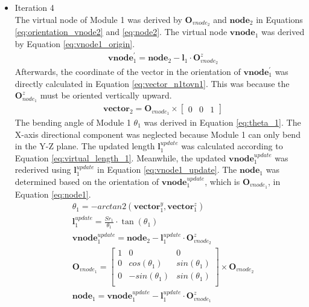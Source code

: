 \begin{itemize}
    \item Iteration 4 \\ %
    The virtual node of Module 1 was derived by $\textbf{O}_{vnode_2}$ and $\textbf{node}_{2}$ in Equations 
    \ref{eq:orientation_vnode2} and \ref{eq:node2}. The virtual node $\textbf{vnode}_{1}$ was derived by Equation 
    \ref{eq:vnode1_origin}.
    \begin{align}
        &\textbf{vnode}_{1}^{'} = \textbf{node}_{2} - \textbf{l}_{1} \cdot \textbf{O}_{vnode_2}^{z}
        \label{eq:vnode1_origin}
    \end{align}
    Afterwards, the coordinate of the vector in the orientation of $\textbf{vnode}_{1}^{'}$ was directly calculated 
    in Equation \ref{eq:vector_n1tovn1}. This was because the $\textbf{O}_{node_1}^{z}$ must be oriented vertically upward.
    \begin{align}
        &\textbf{vector}_{2} = \textbf{O}_{vnode_1} \times \begin{bmatrix} 0 & 0 & 1 \end{bmatrix} 
        \label{eq:vector_n1tovn1} 
    \end{align}
    The bending angle of Module 1 $\theta_1$ was derived in Equation \ref{eq:theta_1}. The X-axis directional 
    component was neglected because Module 1 can only bend in the Y-Z plane. The updated length $\textbf{l}_{1}^{update}$ 
    was calculated according to Equation \ref{eq:virtual_length_1}. Meanwhile, the updated 
    $\textbf{vnode}_{1}^{update}$ was rederived using $\textbf{l}_{1}^{update}$ in Equation \ref{eq:vnode1_update}. 
    The $\textbf{node}_1$ was determined based on the orientation of $\textbf{vnode}_{1}^{update}$, 
    which is $\textbf{O}_{vnode_1}$, in Equation \ref{eq:node1}.
    \begin{align}
        &\theta_1 = -arctan2(\textbf{vector}_{1}^{y},\textbf{vector}_{1}^{z})
        \label{eq:theta_1} \\
        &\textbf{l}_{1}^{update} = \frac{Sr_1}{\theta_1}\cdot \tan(\theta_1)
        \label{eq:virtual_length_1} \\
        &\textbf{vnode}_{1}^{update} = \textbf{node}_{2} - \textbf{l}_{1}^{update} \cdot \textbf{O}_{vnode_2}^{z}
        \label{eq:vnode1_update} \\
        &\textbf{O}_{vnode_1} =     
        \begin{bmatrix}
            1 & 0 & 0 \\
            0 & cos(\theta_1) & sin(\theta_1) \\
            0 & -sin(\theta_1) & sin(\theta_1) \\
        \end{bmatrix}  
        \times \textbf{O}_{vnode_2}
        \label{eq:orientation_vnode1} \\
        &\textbf{node}_1 = \textbf{vnode}_{1}^{update} - \textbf{l}_{1}^{update} \cdot \textbf{O}_{vnode_1}^{z}
        \label{eq:node1} 
    \end{align}
\end{itemize}
